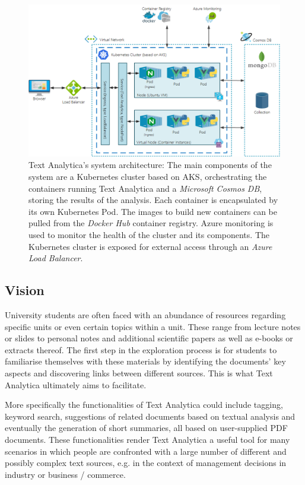 \documentclass[conference]{IEEEtran}
\begin{document}
\begin{figure}[ht!]
\includegraphics[width=150mm]{img/architectur.png}
\caption{Text Analytica’s system architecture: The main components of the system are a Kubernetes cluster based on AKS, orchestrating the containers running Text Analytica and a \textit{Microsoft Cosmos DB}, storing the results of the analysis. Each container is encapsulated by its own Kubernetes Pod. The images to build new containers can be pulled from the \textit{Docker Hub} container registry. Azure monitoring is used to monitor the health of the cluster and its components. The Kubernetes cluster is exposed for external access through an \textit{Azure Load Balancer}.}
\label{img:architecture}
\end{figure}

\subsection{Vision}
University students are often faced with an abundance of resources regarding specific units or even certain topics within a unit. These range from lecture notes or slides to personal notes and additional scientific papers as well as e-books or extracts thereof. The first step in the exploration process is for students to familiarise themselves with these materials by identifying the documents’ key aspects and discovering links between different sources. This is what Text Analytica ultimately aims to facilitate.

More specifically the functionalities of Text Analytica could include tagging, keyword search, suggestions of related documents based on textual analysis and eventually the generation of short summaries, all based on user-supplied PDF documents. These functionalities render Text Analytica a useful tool for many scenarios in which people are confronted with a large number of different and possibly complex text sources, e.g. in the context of management decisions in industry or business / commerce.
\end{document}
